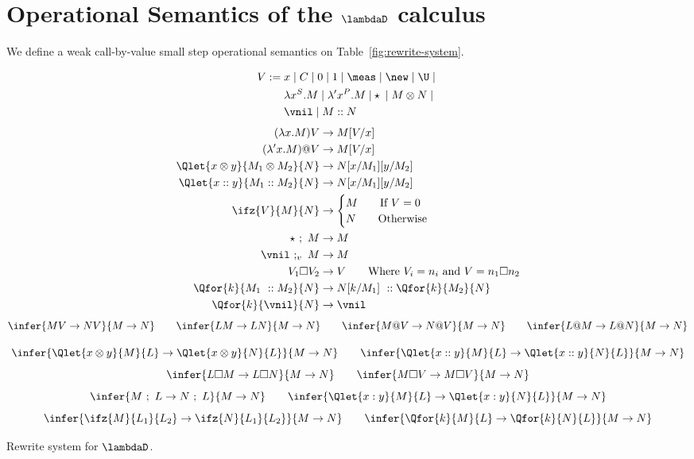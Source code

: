 \section{Operational Semantics of the \texorpdfstring{$\lambdaD$}{lambda sub D} calculus}%
\label{sec:op-semantics}

We define a weak call-by-value small step operational semantics on Table~\ref{fig:rewrite-system}. 
\begin{table}[htbp]
\begin{mdframed}
    \begin{align*}
        V :=\; & x \;|\; C \;|\; 0 \;|\; 1 \;|\; \meas \;|\; \new \;|\; \U \;|\; \\
        & \lambda x^S. M \;|\; \lambda' x^P. M \;| \star \;|\; M \otimes N \;|\; \\
        & \vnil \;|\; M :: N \;\\
    \end{align*}
    \begin{align*}
        (\lambda x.M)V &\to M[V/x]\\
        (\lambda' x.M)@V &\to M[V/x]\\
        \Qlet{x\otimes y}{M_1\otimes M_2}{N}&\to N[x/M_1][y/M_2]\\
        \Qlet{x::y}{M_1 :: M_2}{N}&\to N[x/M_1][y/M_2]\\
        \ifz{V}{M}{N}&\to 
        \begin{cases}
            M\qquad\text{If } V=0 \\ 
            N\qquad\text{Otherwise}
        \end{cases}\\
        \star\ ;\ M &\to M\\
        \vnil\ ;_v\ M &\to M\\
        V_1 \square V_2 &\to V\qquad\text{Where }V_i = n_i\text{ and }V=n_1\square n_2\\
        \Qfor{k}{M_1\ :: M_2}{N} &\to N[k/M_1]\ :: \Qfor{k}{M_2}{N}\\
        \Qfor{k}{\vnil}{N} &\to \vnil\\
    \end{align*}
    \smallskip
    \[
      \infer{MV\to NV}{M\to N}
      \qquad 
      \infer{LM\to LN}{M\to N}
      \qquad
      \infer{M@V\to N@V}{M\to N}
      \qquad 
      \infer{L@M\to L@N}{M\to N}
    \]

    \[
      \infer{\Qlet{x\otimes y}{M}{L}\to \Qlet{x\otimes y}{N}{L}}{M\to N}
      \qquad
      \infer{\Qlet{x:: y}{M}{L}\to \Qlet{x:: y}{N}{L}}{M\to N}
    \]
    \[
      \infer{L\square M\to L\square N}{M\to N}
      \qquad
      \infer{M\square V\to M\square V}{M\to N}
    \]
    \[
      \infer{M\ ;\  L\to N\ ;\ L}{M\to N}
      \qquad
      \infer{\Qlet{x: y}{M}{L}\to \Qlet{x: y}{N}{L}}{M\to N}
    \]
    \[
      \infer{\ifz{M}{L_1}{L_2}\to\ifz{N}{L_1}{L_2}}{M\to N}
      \qquad
      \infer{\Qfor{k}{M}{L}\to\Qfor{k}{N}{L}}{M\to N}
    \]
    \caption{Rewrite system for $\lambdaD$.}
    \label{fig:rewrite-system}
    \end{mdframed}
\end{table}


